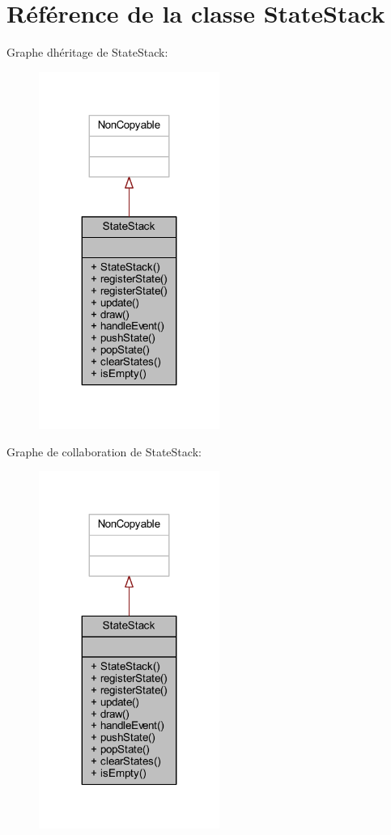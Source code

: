 \hypertarget{class_state_stack}{}\section{Référence de la classe State\+Stack}
\label{class_state_stack}


Graphe d\textquotesingle{}héritage de State\+Stack\+:\nopagebreak
\begin{figure}[H]
\begin{center}
\leavevmode
\includegraphics[width=167pt]{class_state_stack__inherit__graph}
\end{center}
\end{figure}


Graphe de collaboration de State\+Stack\+:\nopagebreak
\begin{figure}[H]
\begin{center}
\leavevmode
\includegraphics[width=167pt]{class_state_stack__coll__graph}
\end{center}
\end{figure}
